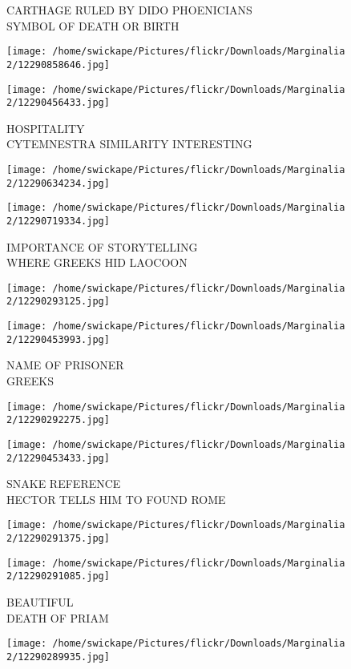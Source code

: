 \documentclass[10pt,letterpaper]{article}
\begin{document}
CARTHAGE RULED BY DIDO PHOENICIANS\\
SYMBOL OF DEATH OR BIRTH
\pagebreak

\texttt{[image: /home/swickape/Pictures/flickr/Downloads/Marginalia 2/12290858646.jpg]}

\vspace{0.25in}
\texttt{[image: /home/swickape/Pictures/flickr/Downloads/Marginalia 2/12290456433.jpg]}

HOSPITALITY\\
CYTEMNESTRA SIMILARITY INTERESTING
\pagebreak

\texttt{[image: /home/swickape/Pictures/flickr/Downloads/Marginalia 2/12290634234.jpg]}

\vspace{0.25in}
\texttt{[image: /home/swickape/Pictures/flickr/Downloads/Marginalia 2/12290719334.jpg]}

IMPORTANCE OF STORYTELLING\\
WHERE GREEKS HID LAOCOON
\pagebreak

\texttt{[image: /home/swickape/Pictures/flickr/Downloads/Marginalia 2/12290293125.jpg]}

\vspace{0.25in}
\texttt{[image: /home/swickape/Pictures/flickr/Downloads/Marginalia 2/12290453993.jpg]}

NAME OF PRISONER\\
GREEKS
\pagebreak

\texttt{[image: /home/swickape/Pictures/flickr/Downloads/Marginalia 2/12290292275.jpg]}

\vspace{0.25in}
\texttt{[image: /home/swickape/Pictures/flickr/Downloads/Marginalia 2/12290453433.jpg]}

SNAKE REFERENCE\\
HECTOR TELLS HIM TO FOUND ROME
\pagebreak

\texttt{[image: /home/swickape/Pictures/flickr/Downloads/Marginalia 2/12290291375.jpg]}

\vspace{0.25in}
\texttt{[image: /home/swickape/Pictures/flickr/Downloads/Marginalia 2/12290291085.jpg]}

BEAUTIFUL\\
DEATH OF PRIAM
\pagebreak

\texttt{[image: /home/swickape/Pictures/flickr/Downloads/Marginalia 2/12290289935.jpg]}
\end{document}
